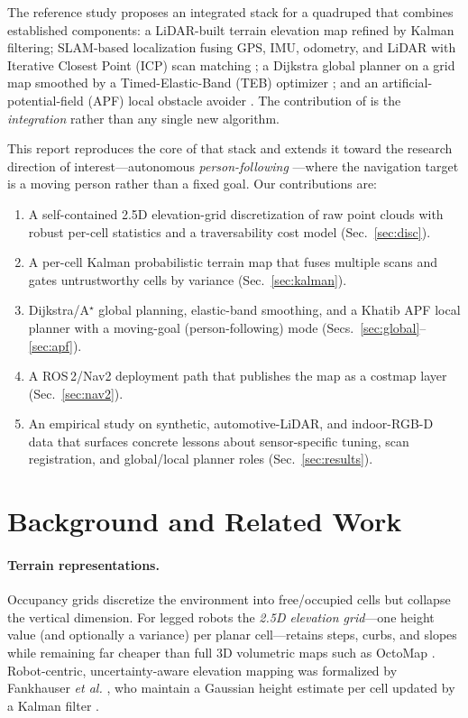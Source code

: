 \documentclass[11pt]{article}
\begin{document}
The reference study \cite{refpaper} proposes an integrated stack for a quadruped
that combines established components: a LiDAR-built terrain elevation map refined
by Kalman filtering; SLAM-based localization fusing GPS, IMU, odometry, and LiDAR
with Iterative Closest Point (ICP) scan matching \cite{besl1992}; a Dijkstra
global planner \cite{dijkstra1959} on a grid map smoothed by a Timed-Elastic-Band
(TEB) optimizer \cite{rosmann2017}; and an artificial-potential-field (APF) local
obstacle avoider \cite{khatib1986}. The contribution of \cite{refpaper} is the
\emph{integration} rather than any single new algorithm.

This report reproduces the core of that stack and extends it toward the
research direction of interest---autonomous \emph{person-following}
\cite{islam2019}---where the navigation target is a moving person rather than a
fixed goal. Our contributions are:
\begin{enumerate}[leftmargin=1.4em,itemsep=1pt]
  \item A self-contained 2.5D elevation-grid discretization of raw point clouds
        with robust per-cell statistics and a traversability cost model
        (Sec.~\ref{sec:disc}).
  \item A per-cell Kalman probabilistic terrain map that fuses multiple scans and
        gates untrustworthy cells by variance (Sec.~\ref{sec:kalman}).
  \item Dijkstra/A$^\star$ global planning, elastic-band smoothing, and a Khatib
        APF local planner with a moving-goal (person-following) mode
        (Secs.~\ref{sec:global}--\ref{sec:apf}).
  \item A ROS\,2/Nav2 deployment path that publishes the map as a costmap layer
        (Sec.~\ref{sec:nav2}).
  \item An empirical study on synthetic, automotive-LiDAR, and indoor-RGB-D data
        that surfaces concrete lessons about sensor-specific tuning, scan
        registration, and global/local planner roles (Sec.~\ref{sec:results}).
\end{enumerate}

\section{Background and Related Work}
\label{sec:related}

\paragraph{Terrain representations.} Occupancy grids \cite{elfes1989} discretize
the environment into free/occupied cells but collapse the vertical dimension. For
legged robots the \emph{2.5D elevation grid}---one height value (and optionally a
variance) per planar cell---retains steps, curbs, and slopes while remaining far
cheaper than full 3D volumetric maps such as OctoMap \cite{hornung2013}.
Robot-centric, uncertainty-aware elevation mapping was formalized by Fankhauser
\emph{et al.} \cite{fankhauser2014,fankhauser2018}, who maintain a Gaussian height
estimate per cell updated by a Kalman filter \cite{kalman1960,thrun2005}.
\end{document}
